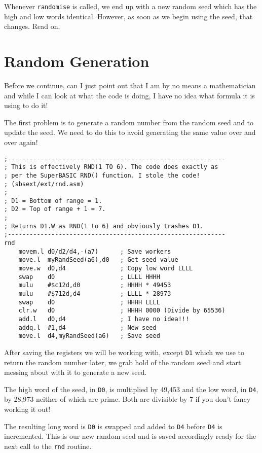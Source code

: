 Whenever \lstinline!randomise! is called, we end up with a new random
seed which has the high and low words identical. However, as soon
as we begin using the seed, that changes. Read on.

\section{Random Generation}

Before we continue, can I just point out that I am by no means a mathematician
and while I can look at what the code is doing, I have no idea what
formula it is using to do it! 

The first problem is to generate a random number from the random seed
and to update the seed. We need to do this to avoid generating the
same value over and over again!

\begin{lstlisting}[caption={Rnd 1 to 6 function - Part 1},firstnumber=49]
;------------------------------------------------------------
; This is effectively RND(1 TO 6). The code does exactly as
; per the SuperBASIC RND() function. I stole the code!
; (sbsext/ext/rnd.asm)
;
; D1 = Bottom of range = 1.
; D2 = Top of range + 1 = 7.
;
; Returns D1.W as RND(1 to 6) and obviously trashes D1.
;------------------------------------------------------------
rnd
    movem.l d0/d2/d4,-(a7)      ; Save workers
    move.l  myRandSeed(a6),d0   ; Get seed value
    move.w  d0,d4               ; Copy low word LLLL
    swap    d0                  ; LLLL HHHH
    mulu    #$c12d,d0           ; HHHH * 49453
    mulu    #$712d,d4           ; LLLL * 28973
    swap    d0                  ; HHHH LLLL
    clr.w   d0                  ; HHHH 0000 (Divide by 65536)
    add.l   d0,d4               ; I have no idea!!!
    addq.l  #1,d4               ; New seed
    move.l  d4,myRandSeed(a6)   ; Save seed

\end{lstlisting}

After saving the registers we will be working with, except \lstinline!D1!
which we use to return the random number later, we grab hold of the
random seed and start messing about with it to generate a new seed. 

The high word of the seed, in \lstinline!D0!, is multiplied by 49,453
and the low word, in \lstinline!D4!, by 28,973 neither of which are
prime. Both are divisible by 7 if you don't fancy working it out!

The resulting long word is \lstinline!D0! is swapped and added to
\lstinline!D4! before \lstinline!D4! is incremented. This is our
new random seed and is saved accordingly ready for the next call to
the \lstinline!rnd! routine.

